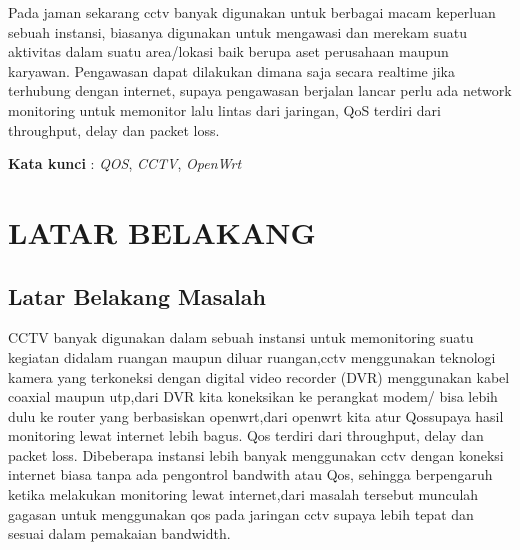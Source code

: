 \documentclass{jtetiproposalskripsi}
\begin{document}
\cover



\begin{abstractind}
Pada jaman sekarang cctv banyak digunakan untuk berbagai macam keperluan sebuah instansi, biasanya digunakan untuk mengawasi dan merekam suatu aktivitas dalam suatu area/lokasi baik berupa aset perusahaan maupun karyawan. Pengawasan dapat dilakukan dimana saja secara realtime jika terhubung dengan internet, supaya pengawasan berjalan lancar perlu ada network monitoring untuk memonitor lalu lintas dari jaringan, QoS terdiri dari throughput, delay dan packet loss.

\bigskip
\textbf{Kata kunci} : \emph{QOS}, \emph{CCTV}, \emph{OpenWrt}
\end{abstractind}

\tableofcontents
{}
\clearpage{}\setcounter{page}{1}

\chapter{LATAR BELAKANG}

\section{Latar Belakang Masalah}
CCTV  banyak digunakan dalam sebuah instansi untuk memonitoring suatu kegiatan didalam ruangan maupun diluar ruangan,cctv menggunakan teknologi kamera yang terkoneksi dengan digital video recorder (DVR) menggunakan kabel coaxial maupun utp,dari DVR kita koneksikan ke perangkat modem/ bisa lebih dulu ke router yang berbasiskan openwrt,dari openwrt kita atur Qossupaya hasil monitoring lewat internet lebih bagus. Qos terdiri dari throughput, delay dan packet loss. Dibeberapa instansi lebih banyak menggunakan cctv dengan koneksi internet biasa tanpa ada pengontrol bandwith atau Qos, sehingga berpengaruh ketika melakukan monitoring lewat internet,dari masalah tersebut munculah gagasan untuk menggunakan qos pada jaringan cctv supaya lebih tepat dan sesuai dalam pemakaian bandwidth. 
\end{document}
